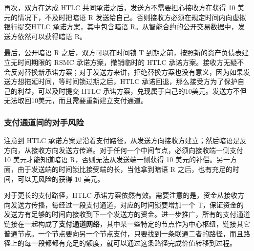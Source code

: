 再次，双方在达成 HTLC 共同承诺之后，发送方不需要担心接收方在获得 10 美元的情况下，不及时把暗语 R 发送给自己。否则接收方必须在规定时间内向虚拟银行提交HTLC 承诺方案，其中包含暗语 R。从智能合约的公开交易数据中，发送方依然可以获得暗语 R。

最后，公开暗语 R 之后，双方可以在时间锁 T 到期之前，按照新的资产负债表建立无时间期限的 RSMC 承诺方案，撤销临时的 HTLC 承诺方案。接收方无疑不会反对替换新承诺方案；对于发送方来讲，拒绝替换方案也没有意义，因为如果发送方想拖延时间，等时间锁过期之后，HTLC 承诺回退，那么接受方为了保护自己的利益，可以及时提交 HTLC 承诺方案，兑现属于自己的10美元。发送方不但无法取回10美元，而且需要重新建立支付通道。

\subsubsection{支付通道间的对手风险}

注意到 HTLC 承诺方案是沿着支付路径，从发送方向接收方建立；然后暗语是反方向，从接收方向发送方传递。对于任何一个中间节点，必须向接收端一侧支付 10 美元才能知道暗语 R，否则无法从发送端一侧获得 10 美元的补偿。另一方面，由于发送端的时间锁比接受端的长，当他拿到暗语 R 之后，也有充足的时间，可以无风险的获得 10 美元。

对于更长的支付路径，HTLC 承诺方案依然有效。需要注意的是，资金从接收方向发送方传播，每经过一段支付通道，对应的时间锁要增加一个 T，保证资金的发送方有足够的时间向接收到下一个发送方的资金。进一步推广，所有的支付通道链接在一起构成了\textbf{支付通道网络}，其中某一些特定的节点作为中心枢纽，链接其它普通节点。一个节点要向另一个节点支付，只要找到一条联通二者的路径，而且路径上的每一段都都有充足的额度，就可以通过这条路径完成价值转移到过程。



